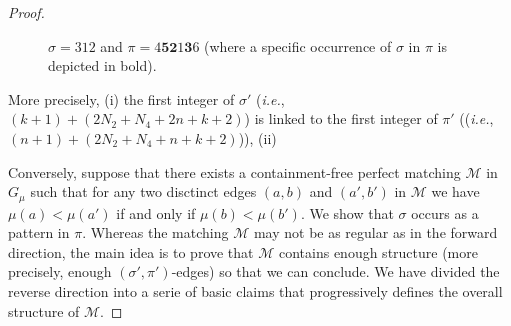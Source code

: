 \documentclass[a4paper]{llncs}
\begin{document}
\begin{proof}
\begin{figure}[t!]
\begin{tikzpicture}
        \end{tikzpicture}
        \caption{\label{fig:subfig:sigma' - pi' - pi'' - sigma''}%
        $\sigma = 312$ and $\pi = 4\mathbf{5}\mathbf{2}1\mathbf{3}6$
        (where a specific occurrence of $\sigma$ in $\pi$ is depicted in bold).
        }
      \end{figure}

  More precisely,
  (i) the first integer of $\sigma'$
  (\emph{i.e.}, $(k+1) + (2N_2 + N_4 + 2n + k + 2)$) is linked
  to the first integer of $\pi'$
  ((\emph{i.e.}, $(n+1) + (2N_2 + N_4 + n + k + 2)$)),
  (ii)

  Conversely, suppose that there exists a containment-free perfect matching
  $\mathcal{M}$ in $G_\mu$ such that for any two disctinct edges
  $(a, b)$ and $(a', b')$ in $\mathcal{M}$
  we have $\mu(a) < \mu(a')$ if and only if $\mu(b) < \mu(b')$.
  We show that $\sigma$ occurs as a pattern in $\pi$.
  Whereas the matching $\mathcal{M}$ may not be as regular as in the forward
  direction, the main idea is to prove that $\mathcal{M}$ contains enough structure
  (more precisely, enough $(\sigma', \pi')$-edges) so that we can conclude.
  We have divided the reverse direction into a serie of basic claims that
  progressively defines the overall structure of $\mathcal{M}$.


\end{proof}
\end{document}
